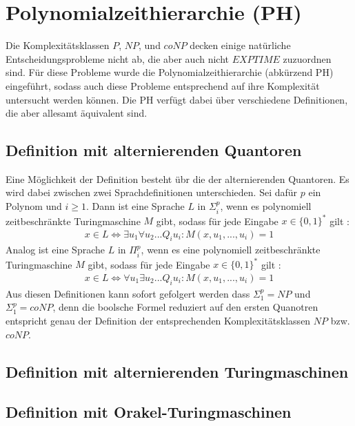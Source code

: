 \chapter{Polynomialzeithierarchie (PH)} \label{chapter: Polynomialzeithierarchie (PH)}
Die Komplexitätsklassen $P$, $NP$, und $coNP$ decken einige natürliche Entscheidungsprobleme nicht ab, die aber auch 
nicht $EXPTIME$ zuzuordnen sind. Für diese Probleme wurde die Polynomialzeithierarchie (abkürzend PH) eingeführt, sodass 
auch diese Probleme entsprechend auf ihre Komplexität untersucht werden können.
Die PH verfügt dabei über verschiedene Definitionen, die aber allesamt äquivalent sind.


\section{Definition mit alternierenden Quantoren} \label{section: Definition PH mit alternierenden Quantoren}
Eine Möglichkeit der Definition besteht übr die der alternierenden Quantoren. Es wird dabei zwischen zwei Sprachdefinitionen unterschieden.
Sei dafür $p$ ein Polynom und $i \geq 1$. Dann ist eine Sprache $L$ in $\Sigma^p_i$, wenn es polynomiell zeitbeschränkte Turingmaschine $M$ gibt, 
sodass für jede Eingabe $x \in \{0,1\}^*$ gilt \cite{rossman_complexity_2015}:
\begin{align*}
    x \in L \Leftrightarrow \exists u_1 \forall u_2 ... Q_i u_i : M(x, u_1, ..., u_i) = 1
\end{align*}
Analog ist eine Sprache $L$ in $\Pi^p_i$, wenn es eine polynomiell zeitbeschränkte Turingmaschine $M$ gibt, sodass für jede Eingabe $x \in \{0,1\}^*$ gilt \cite{arora_computational_2009}:
\begin{align*}
    x \in L \Leftrightarrow \forall u_1 \exists u_2 ... Q_i u_i : M(x, u_1, ..., u_i) = 1
\end{align*}
Aus diesen Definitionen kann sofort gefolgert werden dass $\Sigma^p_1 = NP$ und $\Sigma^p_1 = coNP$, denn die boolsche Formel reduziert auf 
den ersten Quanotren entspricht genau der Definition der entsprechenden Komplexitätsklassen $NP$ bzw. $coNP$.
\section{Definition mit alternierenden Turingmaschinen} \label{section: Definition PH mit ATM}


\section{Definition mit Orakel-Turingmaschinen} \label{section: Definition PH mit Orakel-Turingmaschinen}